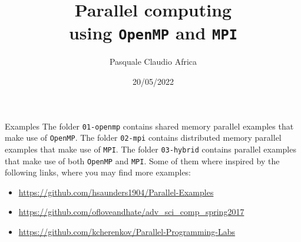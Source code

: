 \documentclass[10pt]{beamer}
\begin{document}
    \title{Parallel computing\protect\\using \texttt{OpenMP} and \texttt{MPI}}
    \author{Pasquale Claudio Africa}
    \date{20/05/2022}

\begin{frame}
    \maketitle
\end{frame}

\begin{frame}{Examples}
The folder \texttt{01-openmp} contains shared memory parallel examples that make use of \texttt{OpenMP}.
\vfill
The folder \texttt{02-mpi} contains distributed memory parallel examples that make use of \texttt{MPI}.
\vfill
The folder \texttt{03-hybrid} contains parallel examples that make use of both \texttt{OpenMP} and \texttt{MPI}.
\vfill
Some of them where inspired by the following links, where you may find more examples:
\begin{itemize}
    \item \url{https://github.com/hsaunders1904/Parallel-Examples}
    \item \url{https://github.com/ofloveandhate/adv_sci_comp_spring2017}
    \item \url{https://github.com/kcherenkov/Parallel-Programming-Labs}
\end{itemize}
\end{frame}
\end{document}
